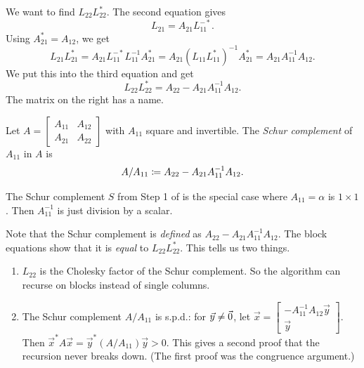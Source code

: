 We want to find $L_{22}L_{22}^\ast$. The second equation gives
\begin{equation*}
  L_{21} = A_{21}L_{11}^{-\ast}.
\end{equation*}
Using $A_{21}^\ast = A_{12}$, we get
\begin{equation}
  L_{21}L_{21}^\ast = A_{21}L_{11}^{-\ast}L_{11}^{-1}A_{21}^\ast = A_{21}(L_{11}L_{11}^\ast)^{-1}A_{21}^\ast = A_{21}A_{11}^{-1}A_{12}.
\end{equation}
We put this into the third equation and get
\begin{equation}
  L_{22}L_{22}^\ast = A_{22} - A_{21}A_{11}^{-1}A_{12}.
\end{equation}
The matrix on the right has a name.

\begin{definition}
  Let $A = \left[\begin{smallmatrix} A_{11} & A_{12} \\ A_{21} & A_{22} \end{smallmatrix}\right]$ with $A_{11}$ square and invertible. The \emph{Schur complement} of $A_{11}$ in $A$ is
  \begin{equation}
    A/A_{11} \coloneqq A_{22} - A_{21}A_{11}^{-1}A_{12}.
  \end{equation}
\end{definition}

The Schur complement $S$ from Step 1 of  is the special case where $A_{11} = \alpha$ is $1 \times 1$. Then $A_{11}^{-1}$ is just division by a scalar.

Note that the Schur complement is \emph{defined} as $A_{22} - A_{21}A_{11}^{-1}A_{12}$. The block equations show that it is \emph{equal} to $L_{22}L_{22}^\ast$. This tells us two things.
\begin{enumerate}
  \item $L_{22}$ is the Cholesky factor of the Schur complement. So the algorithm can recurse on blocks instead of single columns.
  \item The Schur complement $A/A_{11}$ is s.p.d.: for $\vec{y} \ne \vec{0}$, let $\vec{x} = \left[\begin{smallmatrix} -A_{11}^{-1}A_{12}\vec{y} \\ \vec{y} \end{smallmatrix}\right]$. Then $\vec{x}^\ast A\vec{x} = \vec{y}^\ast (A/A_{11})\vec{y} > 0$. This gives a second proof that the recursion never breaks down. (The first proof was the congruence argument.)
\end{enumerate}

